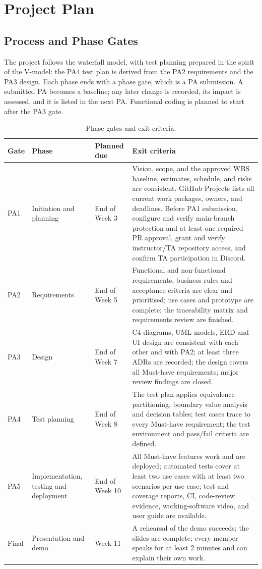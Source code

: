 \section{Project Plan}
\subsection{Process and Phase Gates}

The project follows the waterfall model, with test planning prepared in the
spirit of the V-model: the PA4 test plan is derived from the PA2 requirements
and the PA3 design. Each phase ends with a phase gate, which is a PA submission.
A submitted PA becomes a baseline; any later change is recorded, its impact is
assessed, and it is listed in the next PA. Functional coding is planned to
start after the PA3 gate.

\begin{table}[H]
\centering
\caption{Phase gates and exit criteria.}
\label{tab:gates}
\begin{tabularx}{\textwidth}{@{}L{1.2cm}L{3.0cm}L{2.6cm}Y@{}}
\toprule
\textbf{Gate} & \textbf{Phase} & \textbf{Planned due} & \textbf{Exit criteria}\\
\midrule
PA1 & Initiation and planning & End of Week 3 &
  Vision, scope, and the approved WBS baseline, estimates, schedule, and risks
  are consistent. GitHub Projects lists all current work packages, owners, and
  deadlines. Before PA1 submission, configure and verify main-branch protection
  and at least one required PR approval, grant and verify instructor/TA repository
  access, and confirm TA participation in Discord.\\
PA2 & Requirements & End of Week 5 &
  Functional and non-functional requirements, business rules and acceptance
  criteria are clear and prioritised; use cases and prototype are complete;
  the traceability matrix and requirements review are finished.\\
PA3 & Design & End of Week 7 &
  C4 diagrams, UML models, ERD and UI design are consistent with each other
  and with PA2; at least three ADRs are recorded; the design covers all
  Must-have requirements; major review findings are closed.\\
PA4 & Test planning & End of Week 8 &
  The test plan applies equivalence partitioning, boundary value analysis and
  decision tables; test cases trace to every Must-have requirement;
  the test environment and pass/fail criteria are defined.\\
PA5 & Implementation, testing and deployment & End of Week 10 &
  All Must-have features work and are deployed; automated tests cover at least
  two use cases with at least two scenarios per use case; test and coverage
  reports, CI, code-review evidence, working-software video, and user guide are
  available.\\
Final & Presentation and demo & Week 11 &
  A rehearsal of the demo succeeds; the slides are complete; every member
  speaks for at least 2 minutes and can explain their own work.\\
\bottomrule
\end{tabularx}
\end{table}

